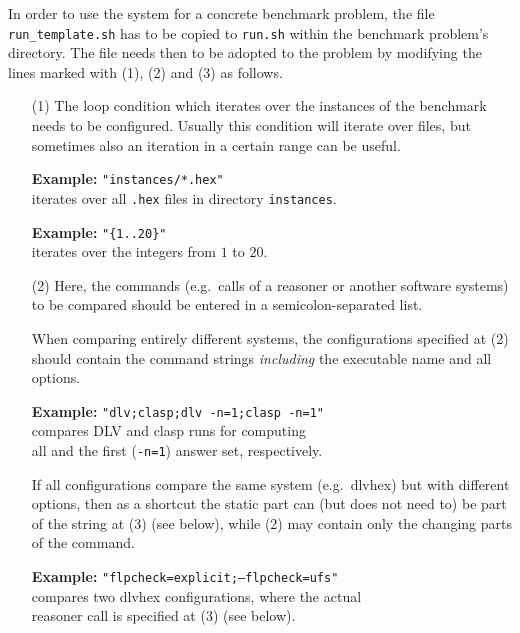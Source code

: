 \documentclass[a4paper]{article}
\newcommand{\dlvhex}{{\sc dlvhex}}
\begin{document}
			In order to use the system for a concrete benchmark problem,
			the file {\tt run\_template.sh}
			has to be copied to {\tt run.sh} within the benchmark problem's directory.
			The file needs then to be adopted to the problem by modifying the lines
			marked with (1), (2) and (3) as follows.
			\begin{enumerate}
			\item[(1)] The loop condition which iterates over the instances of the benchmark needs to be configured.
				Usually this condition will iterate over files, but sometimes also an iteration in a certain range can be useful.

				\begin{tabbing}
					\textbf{Example: } \= {\tt "instances/*.hex"} \\
					\> iterates over all {\tt .hex} files in directory {\tt instances}.
				\end{tabbing}

				\begin{tabbing}
					\textbf{Example: } \= {\tt "\{1..20\}"} \\
					\> iterates over the integers from $1$ to $20$.
				\end{tabbing}
			\item[(2)] Here, the commands (e.g.~calls of a reasoner or another software systems) to be compared should be entered in a semicolon-separated list.

				When comparing entirely different systems,
				the configurations specified at (2) should contain the command strings \emph{including} the executable name and all options.

				\begin{tabbing}
					\textbf{Example: } \= {\tt "dlv;clasp;dlv -n=1;clasp -n=1"} \\
					\> compares {\sc DLV} and {\sc clasp} runs for computing \\
					\> all and the first ({\tt -n=1}) answer set, respectively.
				\end{tabbing}

				If all configurations compare the same system (e.g.~\dlvhex{}) but with different options,
				then as a shortcut the static part can (but does not need to) be part of the string at
				(3) (see below), while (2) may contain only the changing parts of the command.

				\begin{tabbing}
					\textbf{Example: } \= {\tt "flpcheck=explicit;--flpcheck=ufs"} \\
					\> compares two \dlvhex{} configurations, where the actual \\
					\> reasoner call is specified at (3) (see below).
				\end{tabbing}


\end{enumerate}
\end{document}
